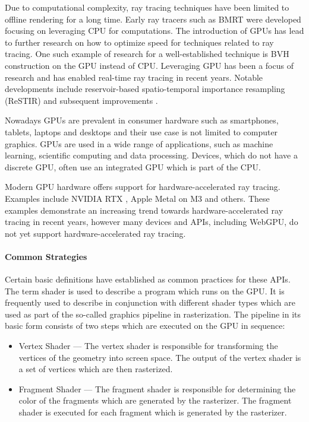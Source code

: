 Due to computational complexity, ray tracing techniques have been limited to offline rendering for a long time. Early ray tracers such as \gls{BMRT} were developed focusing on leveraging \gls{CPU} for computations. The introduction of \glspl{GPU} has lead to further research on how to optimize speed for techniques related to ray tracing. One such example of research for a well-established technique is \gls{BVH} construction on the \gls{GPU} \cite{lauterbach2009GPUbvh} instead of \gls{CPU}. Leveraging \gls{GPU} has been a focus of research and has enabled real-time ray tracing in recent years. Notable developments include reservoir-based spatio-temporal importance resampling (ReSTIR) \cite{restir} and subsequent improvements \cite{restirAdvancements,restirGeneralized}.

Nowadays GPUs are prevalent in consumer hardware such as smartphones, tablets, laptops and desktops and their use case is not limited to computer graphics. GPUs are used in a wide range of applications, such as machine learning, scientific computing and data processing. Devices, which do not have a discrete GPU, often use an integrated GPU which is part of the CPU.

Modern GPU hardware offers support for hardware-accelerated ray tracing. Examples include NVIDIA RTX \cite{nvidiaRtxRayTracing}, Apple Metal on M3 \cite{appleM3GpuAdvancements} and others. These examples demonstrate an increasing trend towards hardware-accelerated ray tracing in recent years, however many devices and \glspl{API}, including \gls{WebGPU}, do not yet support hardware-accelerated ray tracing.

\paragraph{Common Strategies}
\label{sec:commonGpuStrategies}

Certain basic definitions have established as common practices for these \glspl{API}. The term shader is used to describe a program which runs on the \gls{GPU}. It is frequently used to describe in conjunction with different shader types which are used as part of the so-called graphics pipeline in rasterization. The pipeline in its basic form consists of two steps which are executed on the \gls{GPU} in sequence:

\begin{itemize}
    \item{Vertex Shader} — The vertex shader is responsible for transforming the vertices of the geometry into screen space. The output of the vertex shader is a set of vertices which are then rasterized.
    \item{Fragment Shader} — The fragment shader is responsible for determining the color of the fragments which are generated by the rasterizer. The fragment shader is executed for each fragment which is generated by the rasterizer.
\end{itemize}

